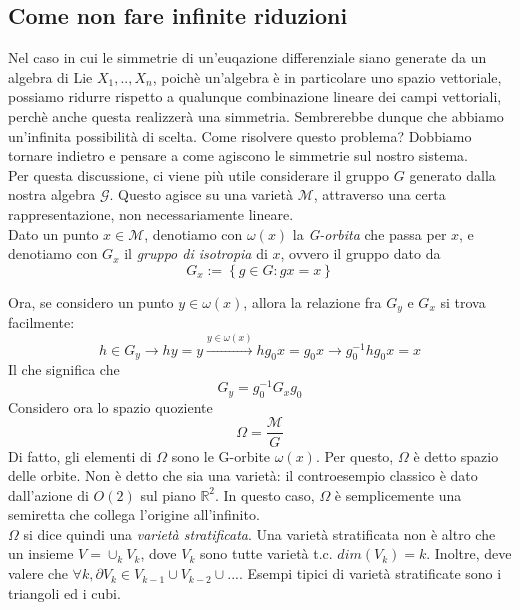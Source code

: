 \documentclass{report}
\begin{document}
\subsection{Come non fare infinite riduzioni}

    Nel caso in cui le simmetrie di un'euqazione differenziale siano generate da un algebra di Lie $X_1, .., X_n$, poichè un'algebra è in particolare uno spazio vettoriale, possiamo ridurre rispetto a qualunque combinazione lineare dei campi vettoriali, perchè anche questa realizzerà una simmetria. Sembrerebbe dunque che abbiamo un'infinita possibilità di scelta. Come risolvere questo problema? Dobbiamo tornare indietro e pensare a come agiscono le simmetrie sul nostro sistema. \\

    Per questa discussione, ci viene più utile considerare il gruppo $G$ generato dalla nostra algebra $\mathcal{G}$. Questo agisce su una varietà $\mathcal{M}$, attraverso una certa rappresentazione, non necessariamente lineare. \\
    Dato un punto $x \in \mathcal{M}$, denotiamo con $\omega(x)$ la \emph{G-orbita} che passa per $x$, e denotiamo con $G_x$ il \emph{gruppo di isotropia} di $x$, ovvero il gruppo dato da 
    \begin{equation}
        G_x := \left\{g \in G : gx= x \right\}
    \end{equation}

    Ora, se considero un punto $y\in \omega(x)$, allora la relazione fra $G_y$ e $G_x$ si trova facilmente: 
    \begin{equation}
        h \in G_y \rightarrow hy = y \xrightarrow{y \in \omega(x)} hg_0x = g_0x \rightarrow g_0^{-1}hg_0 x = x 
    \end{equation}
    Il che significa che 
    \begin{equation}
        G_y = g_0^{-1}G_x g_0
    \end{equation}
    Considero ora lo spazio quoziente 
    \begin{equation}
        \Omega = \frac{\mathcal{M}}{G}
    \end{equation}
    Di fatto, gli elementi di $\Omega$ sono le G-orbite $\omega(x)$. Per questo, $\Omega$ è detto spazio delle orbite. Non è detto che sia una varietà: il controesempio classico è dato dall'azione di $O(2)$ sul piano $\mathbb{R}^2$. In questo caso, $\Omega$ è semplicemente una semiretta che collega l'origine all'infinito. \\
    $\Omega$ si dice quindi una \emph{varietà stratificata}. Una varietà stratificata non è altro che un insieme $V = \cup_k V_k$, dove $V_k$ sono tutte varietà t.c. $dim(V_k) = k$. Inoltre, deve valere che $\forall k, \partial V_k \in V_{k-1} \cup V_{k-2} \cup ...$. Esempi tipici di varietà stratificate sono i triangoli ed i cubi. \\
\end{document}
